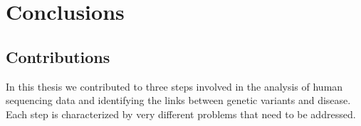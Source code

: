
\chapter{Conclusions \label{ch:concl}}

\section{Contributions}

In this thesis we contributed to three steps involved in the analysis of human sequencing data and identifying the links between genetic variants and disease. Each step is characterized by very different problems that need to be addressed.
					
